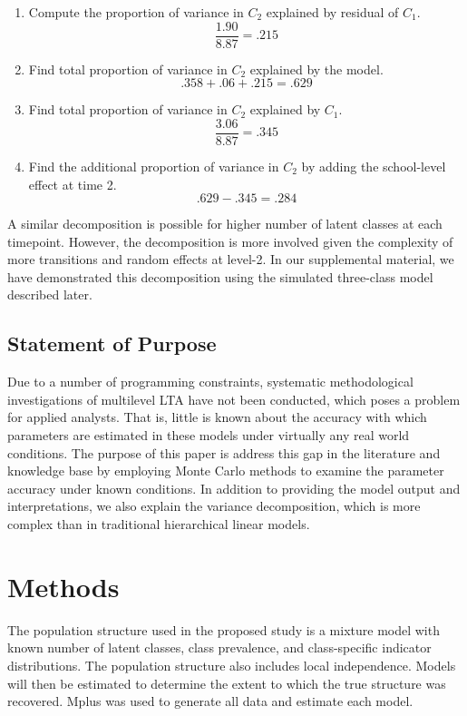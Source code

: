 \documentclass[man, noextraspace, floatsintext, 12pt]{apa7}
\begin{document}
\begin{enumerate}
\item Compute the proportion of variance in $C_2$ explained by residual of $C_1$.
\[ \frac{1.90}{8.87} = .215 \]

\item Find total proportion of variance in $C_2$ explained by the model.
\[ .358 + .06 + .215 = .629 \]

\item Find total proportion of variance in $C_2$ explained by $C_1$.
\[ \frac{3.06}{8.87}=.345 \]

\item Find the additional proportion of variance in $C_2$ by adding the school-level effect at time 2.
\[ .629 - .345 = .284 \]

\end{enumerate}
A similar decomposition is possible for higher number of latent classes at each timepoint.
However, the decomposition is more involved given the complexity of more transitions and random effects at level-2.
In our supplemental material, we have demonstrated this decomposition using the simulated three-class model described later.


\subsection*{Statement of Purpose}
Due to a number of programming constraints, systematic methodological investigations of multilevel LTA have not been conducted, which poses a problem for applied analysts. That is, little is known about the accuracy with which parameters are estimated in these models under virtually any real world conditions. The purpose of this paper is address this gap in the literature and knowledge base by employing Monte Carlo methods to examine the parameter accuracy under known conditions. In addition to providing the model output and interpretations, we also explain the variance decomposition, which is more complex than in traditional hierarchical linear models.

\section*{Methods}
The population structure used in the proposed study is a mixture model with known number of latent classes, class prevalence, and class-specific indicator distributions. The population structure also includes local independence. Models will then be estimated to determine the extent to which the true structure was recovered.  Mplus was used to generate all data and estimate each model. 
\end{document}
